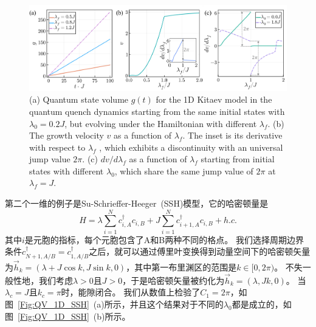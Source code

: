 			\begin{figure}[!htp]
				\centering
				\includegraphics[width=1\textwidth]{figures/QV_1D_kitaev.pdf}
				\centering
					{(a) Quantum state volume $g(t)$ for the 1D Kitaev model in the quantum quench dynamics starting from the same initial states with $\lambda_0=0.2J$, but evolving under the Hamiltonian with different $\lambda_f$.
					(b) The growth velocity $v$ as a function of $\lambda_f$. The inset is its derivative with respect to $\lambda_f$ , which exhibits a discontinuity with an universal jump value $2\pi$.
					(c) $dv/d\lambda_f$ as a function of $\lambda_f$ starting from initial states with different $\lambda_0$, which share the same jump value of $2\pi$ at $\lambda_f=J$.}
				\label{fig:QV_1D_kitaev}
			\end{figure}
		
			第二个一维的例子是Su-Schrieffer-Heeger~(SSH)模型，它的哈密顿量是
			\begin{equation}
				H = \lambda\sum_{i=1}^{N}{c^\dagger_{i,A}c_{i,B}} + J\sum_{i=1}^{N}{c^\dagger_{i+1,A}c_{i,B}} + h.c.
			\end{equation}
			其中$i$是元胞的指标，每个元胞包含了A和B两种不同的格点。
			我们选择周期边界条件$c^\dagger_{N+1,A/B} = c^\dagger_{1,A/B}$之后，就可以通过傅里叶变换得到动量空间下的哈密顿矢量为$\vec{h}_k = (\lambda+J\cos{k},J\sin{k},0)$，其中第一布里渊区的范围是$k \in [0,2\pi)$。
			不失一般性地，我们考虑$\lambda > 0$且$J > 0$，于是哈密顿矢量被约化为$\vec{h}_k = (\lambda,Jk,0)$。
			当$\lambda_c=J$且$k_c=\pi$时，能隙闭合。
			我们从数值上检验了$C_1 = 2\pi$，如图~\ref{Fig:QV_1D_SSH}~(a)所示，并且这个结果对于不同的$\lambda_0$都是成立的，如图~\ref{Fig:QV_1D_SSH}~(b)所示。
			

